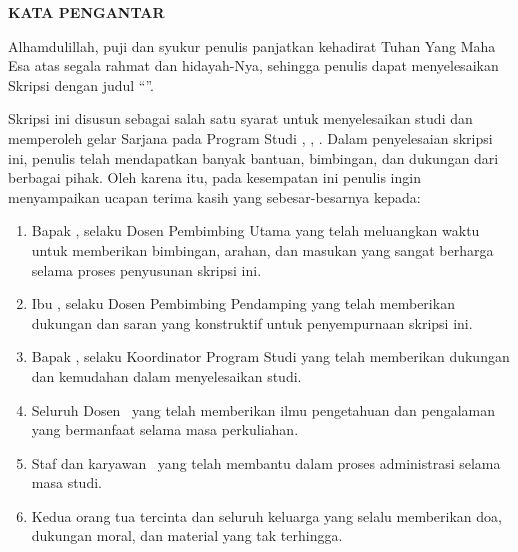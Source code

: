 \begin{center}
    {\textbf{KATA PENGANTAR}}\par
    \vspace{0.1cm}
\end{center}

{\setlength{\parindent}{0.4in}
\setlength{\parskip}{0.5em}

{Alhamdulillah, puji dan syukur penulis panjatkan kehadirat Tuhan Yang Maha Esa atas segala rahmat dan hidayah-Nya, sehingga penulis dapat menyelesaikan Skripsi dengan judul ``\ThesisTitle''.}\par

{Skripsi ini disusun sebagai salah satu syarat untuk menyelesaikan studi dan memperoleh gelar Sarjana pada Program Studi \UniversityProgram, \UniversityFaculty, \UniversityName. Dalam penyelesaian skripsi ini, penulis telah mendapatkan banyak bantuan, bimbingan, dan dukungan dari berbagai pihak. Oleh karena itu, pada kesempatan ini penulis ingin menyampaikan ucapan terima kasih yang sebesar-besarnya kepada:}\par

\begin{enumerate}
    \raggedright %
    \item Bapak \PembimbingI, selaku Dosen Pembimbing Utama yang telah meluangkan waktu untuk memberikan bimbingan, arahan, dan masukan yang sangat berharga selama proses penyusunan skripsi ini.
    
    \item Ibu \PembimbingII, selaku Dosen Pembimbing Pendamping yang telah memberikan dukungan dan saran yang konstruktif untuk penyempurnaan skripsi ini.
    
    \item Bapak \KoordinatorProdi, selaku Koordinator Program Studi \UniversityProgram yang telah memberikan dukungan dan kemudahan dalam menyelesaikan studi.
    
    \item Seluruh Dosen \UniversityDepartment\ yang telah memberikan ilmu pengetahuan dan pengalaman yang bermanfaat selama masa perkuliahan.
    
    \item Staf dan karyawan \UniversityFaculty\ yang telah membantu dalam proses administrasi selama masa studi.
    
    \item Kedua orang tua tercinta dan seluruh keluarga yang selalu memberikan doa, dukungan moral, dan material yang tak terhingga.
    

\end{enumerate}}
